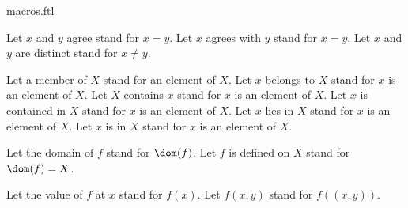 \documentclass{stex}
\begin{document}
\begin{smodule}{macros.ftl}
  \begin{forthel}

    Let $x$ and $y$ agree stand for $x = y$.
    Let $x$ agrees with $y$ stand for $x = y$.
    Let $x$ and $y$ are distinct stand for $x \neq y$.


    Let a member of $X$ stand for an element of $X$.
    Let $x$ belongs to $X$ stand for $x$ is an element of $X$.
    Let $X$ contains $x$ stand for $x$ is an element of $X$.
    Let $x$ is contained in $X$ stand for $x$ is an element of $X$.
    Let $x$ lies in $X$ stand for $x$ is an element of $X$.
    Let $x$ is in $X$ stand for $x$ is an element of $X$.


    Let the domain of $f$ stand for $\dom(f)$.
    Let $f$ is defined on $X$ stand for $\dom(f) = X$.


    Let the value of $f$ at $x$ stand for $f(x)$.
    Let $f(x,y)$ stand for $f((x,y))$.
  \end{forthel}
\end{smodule}
\end{document}
